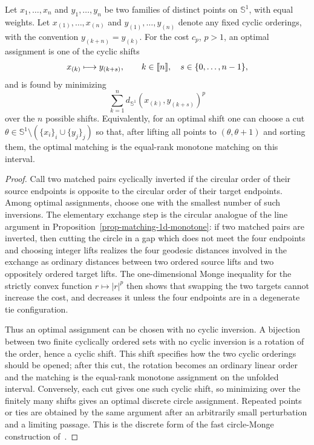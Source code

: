 \begin{proposition}\label{prop-circle-ot-cut}
	Let $x_1,\ldots,x_n$ and $y_1,\ldots,y_n$ be two families of distinct points on $\mathbb S^1$, with equal weights. Let $x_{(1)},\ldots,x_{(n)}$ and $y_{(1)},\ldots,y_{(n)}$ denote any fixed cyclic orderings, with the convention $y_{(k+n)}=y_{(k)}$. For the cost $c_p$, $p>1$, an optimal assignment is one of the cyclic shifts
	\[
		x_{(k)}\longmapsto y_{(k+s)},\qquad k\in\llbracket n\rrbracket,\quad s\in\{0,\ldots,n-1\},
	\]
	and is found by minimizing
	\[
		\sum_{k=1}^n d_{\mathbb S^1}\!\left(x_{(k)},y_{(k+s)}\right)^p
	\]
	over the $n$ possible shifts. Equivalently, for an optimal shift one can choose a cut $\theta\in\mathbb S^1\setminus(\{x_i\}_i\cup\{y_j\}_j)$ so that, after lifting all points to $(\theta,\theta+1)$ and sorting them, the optimal matching is the equal-rank monotone matching on this interval.
\end{proposition}

\begin{proof}
	Call two matched pairs cyclically inverted if the circular order of their source endpoints is opposite to the circular order of their target endpoints. Among optimal assignments, choose one with the smallest number of such inversions. The elementary exchange step is the circular analogue of the line argument in Proposition~\ref{prop-matching-1d-monotone}: if two matched pairs are inverted, then cutting the circle in a gap which does not meet the four endpoints and choosing integer lifts realizes the four geodesic distances involved in the exchange as ordinary distances between two ordered source lifts and two oppositely ordered target lifts. The one-dimensional Monge inequality for the strictly convex function $r\mapsto |r|^p$ then shows that swapping the two targets cannot increase the cost, and decreases it unless the four endpoints are in a degenerate tie configuration.
	
	Thus an optimal assignment can be chosen with no cyclic inversion. A bijection between two finite cyclically ordered sets with no cyclic inversion is a rotation of the order, hence a cyclic shift. This shift specifies how the two cyclic orderings should be opened; after this cut, the rotation becomes an ordinary linear order and the matching is the equal-rank monotone assignment on the unfolded interval. Conversely, each cut gives one such cyclic shift, so minimizing over the finitely many shifts gives an optimal discrete circle assignment. Repeated points or ties are obtained by the same argument after an arbitrarily small perturbation and a limiting passage. This is the discrete form of the fast circle-Monge construction of~\cite{delon-circle}.
\end{proof}

